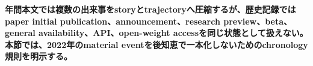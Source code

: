 \noindent\textbf{年間本文では複数の出来事をstoryとtrajectoryへ圧縮するが、歴史記録ではpaper initial publication、announcement、research preview、beta、general availability、API、open-weight accessを同じ状態として扱えない。本節では、2022年のmaterial eventを後知恵で一本化しないためのchronology規則を明示する。}
